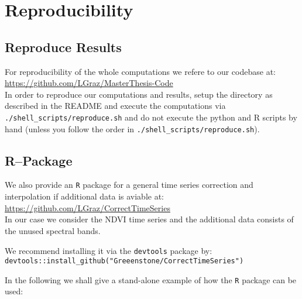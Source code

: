 \chapter{Reproducibility}

\section{Reproduce Results}
For reproducibility of the whole computations we refere to our codebase at:\\ \url{https://github.com/LGraz/MasterThesis-Code}\\ In order to reproduce our computations and results, setup the directory as described in the README and execute the computations via \texttt{./shell\_scripts/reproduce.sh} and do not execute the python and R scripts by hand (unless you follow the order in \texttt{./shell\_scripts/reproduce.sh}).

\section{R--Package}
We also provide an \texttt{R} package for a general time series correction and interpolation if additional data is aviable at: \\
\url{https://github.com/LGraz/CorrectTimeSeries} \\
In our case we consider the NDVI time series and the additional data consists of the unused spectral bands.

We recommend installing it via the \texttt{devtools} package by:\\
\texttt{devtools::install\_github("Greeenstone/CorrectTimeSeries")}

In the following we shall give a stand-alone example of how the \texttt{R} package can be used:


